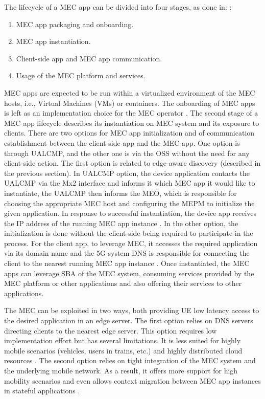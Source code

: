 \documentclass[12pt,a4paper,twoside]{report}
\begin{document}
The lifecycle of a MEC app can be divided into four stages, as done in: \cite{ETSI:wp20}:
\begin{enumerate}
	\item MEC app packaging and onboarding.
	\item MEC app instantiation. 
	\item Client-side app and MEC app communication. 
	\item Usage of the MEC platform and services. 
\end{enumerate}
MEC apps are expected to be run within a virtualized environment of the MEC hosts, i.e., Virtual Machines (VMs) or containers. The onboarding of MEC apps is left as an implementation choice for the MEC operator \cite{ETSI:wp20}. The second stage of a MEC app lifecycle describes its instantiation on MEC system and its exposure to clients. There are two options for MEC app initialization and of communication establishment between the client-side app and the MEC app. One option is through UALCMP, and the other one is via the OSS without the need for any client-side action. The first option is related to edge-aware discovery (described in the previous section). In UALCMP option, the device application contacts the UALCMP via the Mx2 interface and informs it which MEC app it would like to instantiate, the UALCMP then informs the MEO, which is responsible for choosing the appropriate MEC host and configuring the MEPM to initialize the given application. In response to successful instantiation, the device app receives the IP address of the running MEC app instance \cite{ETSI:wp20}. In the other option, the initialization is done without the client-side being required to participate in the process. For the client app, to leverage MEC, it accesses the required application via its domain name and the 5G system DNS is responsible for connecting the client to the nearest running MEC app instance \cite{ETSI:wp20,ETSI:wp36}. Once instantiated, the MEC apps can leverage SBA of the MEC system, consuming services provided by the MEC platform or other applications and also offering their services to other applications.

The MEC can be exploited in two ways, both providing UE low latency access to the desired application in an edge server. The first option relies on DNS servers directing clients to the nearest edge server. This option requires low implementation effort but has several limitations. It is less suited for highly mobile scenarios (vehicles, users in trains, etc.) and highly distributed cloud resources \cite{ETSI:wp36}. The second option relies on tight integration of the MEC system and the underlying mobile network. As a result, it offers more support for high mobility scenarios and even allows context migration between MEC app instances in stateful applications \cite{ETSI:wp36}.
\end{document}
